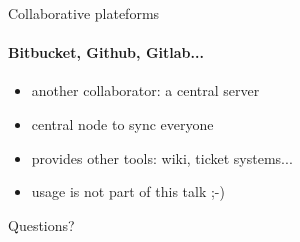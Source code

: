 \documentclass[english]{slides}
\begin{document}
\begin{frame}{Collaborative plateforms }
\framesubtitle{Bitbucket, Github, Gitlab...}
\begin{itemize}
  \item another collaborator: a central server 
  \item central node to sync everyone
  \item provides other tools: wiki, ticket systems...
  \item usage is not part of this talk ;-)
\end{itemize}
\end{frame}


\begin{frame}
\begin{center}\huge
Questions?
\end{center}
\end{frame}
\end{document}
